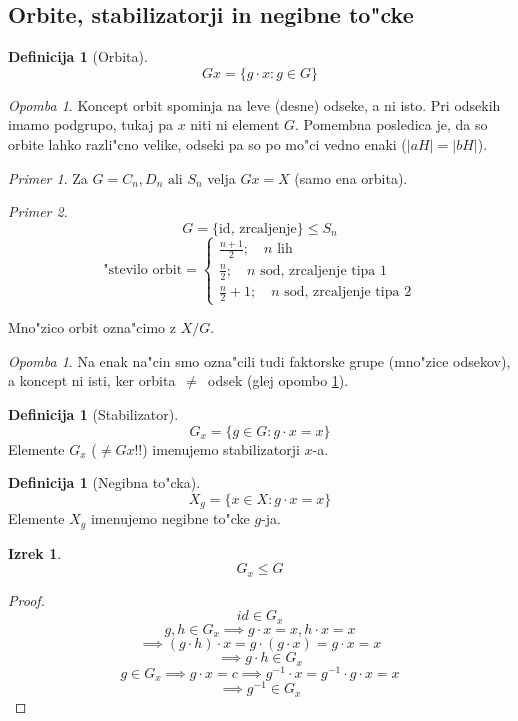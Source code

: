 \documentclass[a4paper,12pt]{article}
\theoremstyle{definition}
\newtheorem{defn}[counter]{Definicija}
\newtheorem{theorem}[counter]{Izrek}
\theoremstyle{remark}
\newtheorem*{ex}{Primer}
\newtheorem*{rem}{Opomba}
\newtheorem{rem*}[counter]{Opomba}
\begin{document}
\subsection{Orbite, stabilizatorji in negibne to"cke}
\begin{defn}[Orbita]
	$$Gx = \{g \cdot x: g \in G\}$$
\end{defn}
\begin{rem*}
	\label{orbita_neq_odsek}
	Koncept orbit spominja na leve (desne) odseke, a ni isto. Pri odsekih imamo podgrupo, tukaj pa $x$ niti ni element $G$. Pomembna posledica je, da so orbite lahko razli"cno velike, odseki pa so po mo"ci vedno enaki ($|aH|=|bH|$).
\end{rem*}
\begin{ex}
	Za $G=C_n, D_n \text{ ali } S_n$ velja $Gx = X$ (samo ena orbita).
\end{ex}
\begin{ex}
	$$G = \lbrace\text{id, zrcaljenje}\rbrace \leqslant S_n$$
	$$\text{"stevilo orbit} = \begin{cases}\frac{n+1}{2}; \quad n\text{ lih} \\ \frac{n}{2}; \quad n\text{ sod, zrcaljenje tipa }1 \\ \frac{n}{2}+1; \quad  n\text{ sod, zrcaljenje tipa }2\end{cases}$$
\end{ex}
Mno"zico orbit ozna"cimo z $X/G$.
\begin{rem}
	Na enak na"cin smo ozna"cili tudi faktorske grupe (mno"zice odsekov), a koncept ni isti, ker orbita~$\neq$~odsek (glej opombo \ref{orbita_neq_odsek}).
\end{rem}
\begin{defn}[Stabilizator]
	$$G_x = \lbrace g \in G: g \cdot x = x \rbrace$$
	Elemente $G_x$ ($\neq Gx$!!) imenujemo stabilizatorji $x$-a.
\end{defn}
\begin{defn}[Negibna to"cka]
	$$X_g = \lbrace x \in X: g \cdot x = x \rbrace$$
	Elemente $X_g$ imenujemo negibne to"cke $g$-ja.
\end{defn}
\begin{theorem}
	$$G_x \leqslant G$$
\end{theorem}
\begin{proof}
	$$id \in G_x$$
	$$g, h \in G_x \implies g \cdot x = x, h \cdot x = x$$
	$$\implies (g \cdot h) \cdot x = g \cdot (g \cdot x) = g \cdot x = x $$
	$$\implies g \cdot h \in G_x$$
	$$g \in G_x \implies g \cdot x = c \implies g^{-1} \cdot x = g^{-1} \cdot g \cdot x = x$$
	$$ \implies g^{-1} \in G_x $$
\end{proof}
\end{document}
